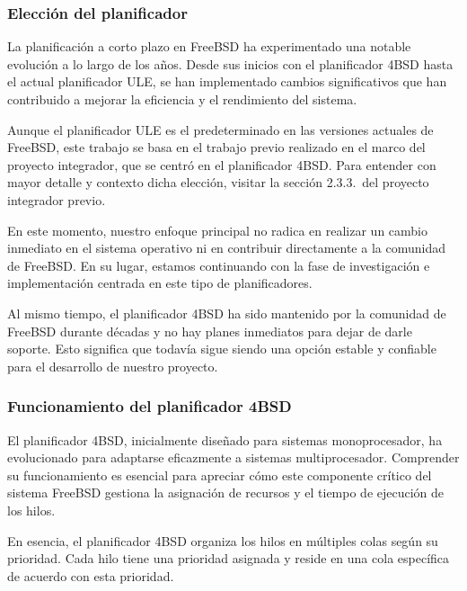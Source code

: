 \subsubsection{Elección del planificador}

La planificación a corto plazo en FreeBSD ha experimentado una notable evolución a lo largo de los años. Desde sus inicios con el planificador 4BSD hasta el actual planificador ULE, se han implementado cambios significativos que han contribuido a mejorar la eficiencia y el rendimiento del sistema.\par

Aunque el planificador ULE es el predeterminado en las versiones actuales de FreeBSD, este trabajo se basa en el trabajo previo realizado en el marco del proyecto integrador, que se centró en el planificador 4BSD\@. Para entender con mayor detalle y contexto dicha elección, visitar la sección 2.3.3.\ del proyecto integrador previo\cite{bib1}.

En este momento, nuestro enfoque principal no radica en realizar un cambio inmediato en el sistema operativo ni en contribuir directamente a la comunidad de FreeBSD\@. En su lugar, estamos continuando con la fase de investigación e implementación centrada en este tipo de planificadores.\par

Al mismo tiempo, el planificador 4BSD ha sido mantenido por la comunidad de FreeBSD durante décadas y no hay planes inmediatos para dejar de darle soporte. Esto significa que todavía sigue siendo una opción estable y confiable para el desarrollo de nuestro proyecto.\par

\subsubsection{Funcionamiento del planificador 4BSD}

El planificador 4BSD, inicialmente diseñado para sistemas monoprocesador, ha evolucionado para adaptarse eficazmente a sistemas multiprocesador. Comprender su funcionamiento es esencial para apreciar cómo este componente crítico del sistema FreeBSD gestiona la asignación de recursos y el tiempo de ejecución de los hilos.\par

En esencia, el planificador 4BSD organiza los hilos en múltiples colas según su prioridad. Cada hilo tiene una prioridad asignada y reside en una cola específica de acuerdo con esta prioridad.\par

